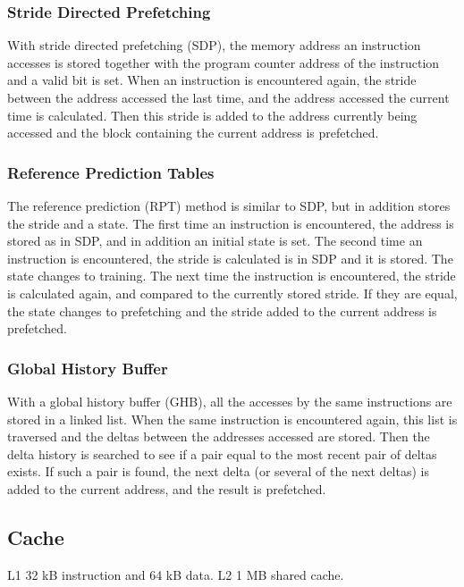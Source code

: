 \subsubsection{Stride Directed Prefetching}

With stride directed prefetching (SDP), the memory address an instruction
accesses is stored together with the program counter address of the instruction
and a valid bit is set. When an instruction is encountered again, the stride
between the address accessed the last time, and the address accessed the
current time is calculated. Then this stride is added to the address currently
being accessed and the block containing the current address is prefetched.

\subsubsection{Reference Prediction Tables}

The reference prediction (RPT) method is similar to SDP, but in
addition stores the stride and a state. The first time an
instruction is encountered, the address is stored as in SDP, and
in addition an initial state is set. The second time an instruction
is encountered, the stride is calculated is in SDP and it is stored.
The state changes to training. The next time the instruction is
encountered, the stride is calculated again, and compared to the
currently stored stride. If they are equal, the state changes to
prefetching and the stride added to the current address is
prefetched.

\subsubsection{Global History Buffer}

With a global history buffer (GHB), all the accesses by the same
instructions are stored in a linked list. When the same
instruction is encountered again, this list is traversed and the
deltas between the addresses accessed are stored. Then the delta
history is searched to see if a pair equal to the most recent pair
of deltas exists. If such a pair is found, the next delta (or
several of the next deltas) is added to the current address,
and the result is prefetched.

\subsection{Cache}

L1 32 kB instruction and 64 kB data.
L2 1 MB shared cache.

